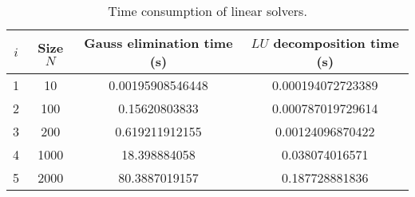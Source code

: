 \begin{table}[h]
\centering
\begin{tabular}{cccc}
\hline\hline
$i$ & Size $N$ & Gauss elimination time (s) & $LU$ decomposition time (s) \\
\hline
1 & 10 & 0.00195908546448 & 0.000194072723389 \\
2 & 100 & 0.15620803833 & 0.000787019729614 \\
3 & 200 & 0.619211912155 & 0.00124096870422 \\
4 & 1000 & 18.398884058 & 0.038074016571 \\
5 & 2000 & 80.3887019157 & 0.187728881836 \\
\hline\hline
\end{tabular}
\caption{Time consumption of linear solvers.}
\label{tb}
\end{table}
